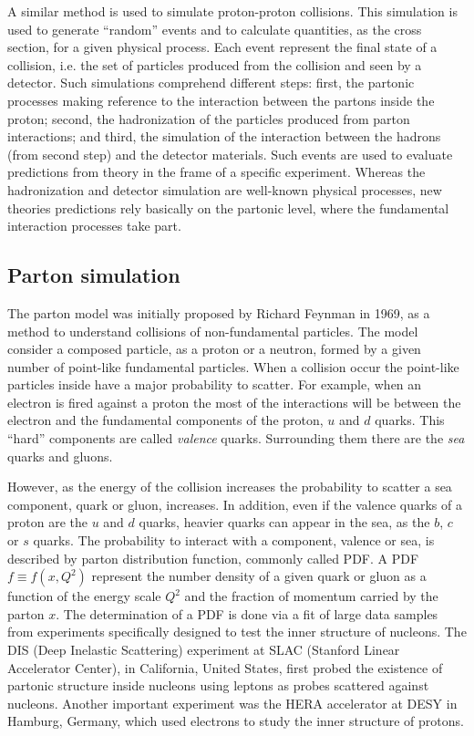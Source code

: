A similar method is used to simulate proton-proton collisions. This simulation is used to generate ``random'' events and to calculate quantities, as the cross section, for a given physical process. Each event represent the final state of a collision, i.e. the set of particles produced from the collision and seen by a detector. Such simulations comprehend different steps: first, the partonic processes making reference to the interaction between the partons inside the proton; second, the hadronization of the particles produced from parton interactions; and third, the simulation of the interaction between the hadrons (from second step) and the detector materials. Such events are used to evaluate predictions from theory in the frame of a specific experiment. Whereas the hadronization and detector simulation are well-known physical processes, new theories predictions rely basically on the partonic level, where the fundamental interaction processes take part.

\subsection{Parton simulation}
\label{sec:parton}

The parton model was initially proposed by Richard Feynman in 1969, as a method to understand collisions of non-fundamental particles. The model consider a composed particle, as a proton or a neutron, formed by a given number of point-like fundamental particles. When a collision occur the point-like particles inside have a major probability to scatter. For example, when an electron is fired against a proton the most of the interactions will be between the electron and the fundamental components of the proton, $u$ and $d$ quarks. This ``hard'' components are called \textit{valence} quarks. Surrounding them there are the \textit{sea} quarks and gluons.

However, as the energy of the collision increases the probability to scatter a sea component, quark or gluon, increases. In addition, even if the valence quarks of a proton are the $u$ and $d$ quarks, heavier quarks can appear in the sea, as the $b$, $c$ or $s$ quarks. The probability to interact with a component, valence or sea, is described by parton distribution function, commonly called PDF. A PDF $f\equiv f(x,Q^{2})$ represent the number density of a given quark or gluon as a function of the energy scale $Q^{2}$ and the fraction of momentum carried by the parton $x$. The determination of a PDF is done via a fit of large data samples from experiments specifically designed to test the inner structure of nucleons. The DIS (Deep Inelastic Scattering) experiment at SLAC (Stanford Linear Accelerator Center), in California, United States, first probed the existence of partonic structure inside nucleons using leptons as probes scattered against nucleons. Another important experiment was the HERA accelerator at DESY in Hamburg, Germany, which used electrons to study the inner structure of protons.

